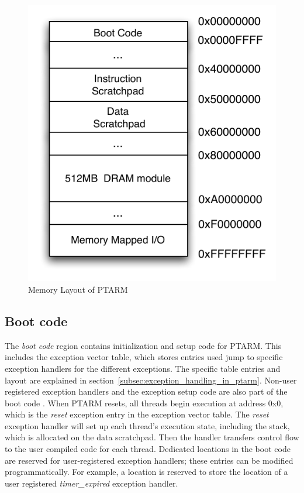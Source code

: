 \begin{figure}
  \vspace{-30pt}
  \begin{center}
    \includegraphics[scale=.65]{figs/ptarm_memory_layout}
  \end{center}
  \vspace{-5mm}
  \caption{Memory Layout of PTARM}
  \label{fig:ptarm_memory_layout}
\end{figure} 

\subsection{Boot code}
The \emph{boot code} region contains initialization and setup code for PTARM. 
This includes the exception vector table, which stores entries used jump to specific exception handlers for the different exceptions.
The specific table entries and layout are explained in section~\ref{subsec:exception_handling_in_ptarm}. 
Non-user registered exception handlers and the exception setup code are also part of the boot code .
When PTARM resets, all threads begin execution at address 0x0, which is the \emph{reset} exception entry in the exception vector table.
The \emph{reset} exception handler will set up each thread's execution state, including the stack, which is allocated on the data scratchpad.
Then the handler transfers control flow to the user compiled code for each thread.  
Dedicated locations in the boot code are reserved for user-registered exception handlers; these entries can be modified programmatically. 
For example, a location is reserved to store the location of a user registered \emph{timer\_expired} exception handler.

